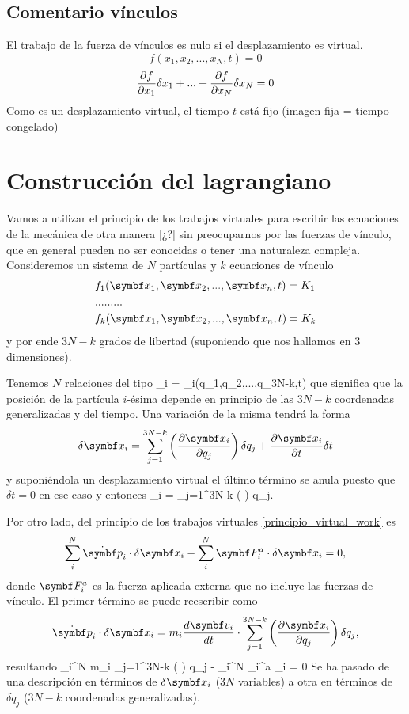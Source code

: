 \documentclass[10pt,oneside]{CBFT_book}
\begin{document}
\subsection{Comentario vínculos}
El trabajo de la fuerza de vínculos es nulo si el desplazamiento es virtual.
\[
	f(x_1,x_2,...,x_N,t) = 0
\]
\[
	\frac{\partial^{\hspace{-0.05em}} {f}}{\partial {x_1}^{\hspace{-0.05em}}}\delta x_1 + ... +  \frac{\partial^{\hspace{-0.05em}} {f}}{\partial {x_N}^{\hspace{-0.05em}}}\delta x_N = 0
\]
Como es un desplazamiento virtual, el tiempo $t$ está fijo (imagen fija = tiempo congelado)


\section{Construcción del lagrangiano}

Vamos a utilizar el principio de los trabajos virtuales para escribir las ecuaciones de la mecánica
de otra manera [¿?] sin preocuparnos por las fuerzas de vínculo, que en general pueden no ser 
conocidas o tener una naturaleza compleja.
Consideremos un sistema de $N$ partículas y $k$ ecuaciones de vínculo 
\begin{eqnarray*}
	& f_1(\vb{x}_1, \vb{x}_2,...,\vb{x}_n,t) = K_1  \\ 
	& ... ... ... \\
	& f_k(\vb{x}_1, \vb{x}_2,...,\vb{x}_n,t) = K_k 
\end{eqnarray*}
y por ende $3N-k$ grados de libertad (suponiendo que nos hallamos en 3 dimensiones).

Tenemos $N$ relaciones del tipo 
\be
	_i = _i(q_1,q_2,...,q_{3N-k},t)
	\label{x_part}
\ee
que significa que la posición de la partícula $i$-ésima depende en principio de las $3N-k$ coordenadas
generalizadas y del tiempo. Una variación de la misma tendrá la forma
\[
	\delta \vb{x}_i =  \sum_{j=1}^{3N-k} \left( \dpar{\vb{x}_i}{q_j} \right) \delta q_j + 
	\dpar{\vb{x}_i}{t}\delta t
\]
y suponiéndola un desplazamiento virtual el último término se anula puesto que $\delta t=0$ en ese
caso y entonces
\be
	\delta {}_i =  \sum_{j=1}^{3N-k} \left(  \right) \delta q_j.
	\label{delta_x_to_delta_q}
\ee

Por otro lado, del principio de los trabajos virtuales \eqref{principio_virtual_work} es
\[
	\sum_i^N \dot{\vb{p}}_i \cdot \delta \vb{x}_i - \sum_i^N  \vb{F}_i^a \cdot \delta \vb{x}_i = 0,
\]
donde $\vb{F}_i^a$ es la fuerza aplicada externa que no incluye las fuerzas de vínculo. El primer término 
se puede reescribir como
\[
	\dot{\vb{p}}_i \cdot \delta \vb{x}_i = m_i \dtot{\vb{v}_i}{t} \cdot \sum_{j=1}^{3N-k} 
	\left( \dpar{\vb{x}_i}{q_j} \right) \delta q_j,
\]
resultando
\be
	\sum_i^N m_i  \cdot \sum_{j=1}^{3N-k} \left(  \right)
	\delta q_j - \sum_i^N  _i^a \cdot \delta {}_i = 0
	\label{virtual_work_2}
\ee
Se ha pasado de una descripción en términos de $\delta \vb{x}_i$ ($3N$ variables) a otra en términos de $\delta q_j$
($3N-k$ coordenadas generalizadas).
\end{document}
